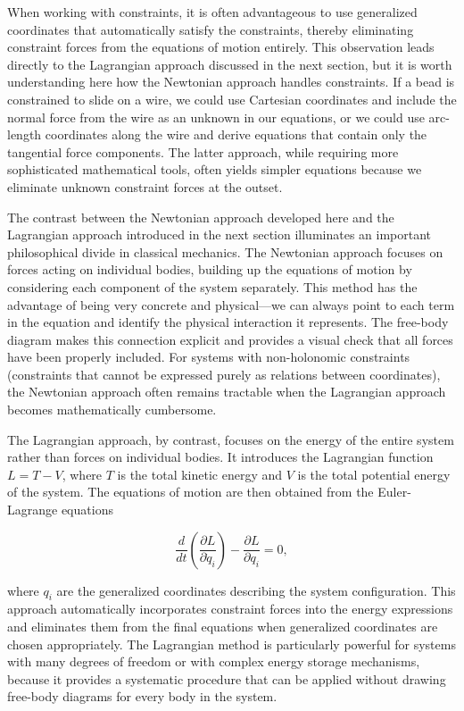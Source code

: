When working with constraints, it is often advantageous to use generalized coordinates that automatically satisfy the constraints, thereby eliminating constraint forces from the equations of motion entirely. This observation leads directly to the Lagrangian approach discussed in the next section, but it is worth understanding here how the Newtonian approach handles constraints. If a bead is constrained to slide on a wire, we could use Cartesian coordinates and include the normal force from the wire as an unknown in our equations, or we could use arc-length coordinates along the wire and derive equations that contain only the tangential force components. The latter approach, while requiring more sophisticated mathematical tools, often yields simpler equations because we eliminate unknown constraint forces at the outset.

The contrast between the Newtonian approach developed here and the Lagrangian approach introduced in the next section illuminates an important philosophical divide in classical mechanics. The Newtonian approach focuses on forces acting on individual bodies, building up the equations of motion by considering each component of the system separately. This method has the advantage of being very concrete and physical—we can always point to each term in the equation and identify the physical interaction it represents. The free-body diagram makes this connection explicit and provides a visual check that all forces have been properly included. For systems with non-holonomic constraints (constraints that cannot be expressed purely as relations between coordinates), the Newtonian approach often remains tractable when the Lagrangian approach becomes mathematically cumbersome.

The Lagrangian approach, by contrast, focuses on the energy of the entire system rather than forces on individual bodies. It introduces the Lagrangian function $L = T - V$, where $T$ is the total kinetic energy and $V$ is the total potential energy of the system. The equations of motion are then obtained from the Euler-Lagrange equations

\[
\frac{d}{dt}\left(\frac{\partial L}{\partial \dot{q}_i}\right) - \frac{\partial L}{\partial q_i} = 0,
\]

where $q_i$ are the generalized coordinates describing the system configuration. This approach automatically incorporates constraint forces into the energy expressions and eliminates them from the final equations when generalized coordinates are chosen appropriately. The Lagrangian method is particularly powerful for systems with many degrees of freedom or with complex energy storage mechanisms, because it provides a systematic procedure that can be applied without drawing free-body diagrams for every body in the system.

